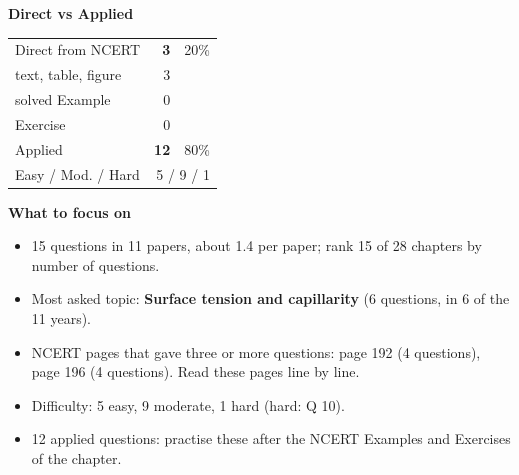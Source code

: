 \begin{minipage}[t]{0.34\linewidth}{\small\textbf{\color{crimson}Direct vs Applied}\par\smallskip
\begin{tabular}{@{}lrr@{}}\toprule
Direct from NCERT & \textbf{3} & 20\%\\
\quad text, table, figure & 3 &\\
\quad solved Example & 0 &\\
\quad Exercise & 0 &\\
Applied & \textbf{12} & 80\%\\\midrule
Easy / Mod. / Hard & \multicolumn{2}{r}{5 / 9 / 1}\\\bottomrule
\end{tabular}}\end{minipage}\hfill
\begin{minipage}[t]{0.63\linewidth}{\small\textbf{\color{crimson}What to focus on}\par\smallskip
\begin{itemize}[leftmargin=1.1em,itemsep=1pt,topsep=0pt]
\item 15 questions in 11 papers, about 1.4 per paper; rank 15 of 28 chapters by number of questions.
\item Most asked topic: \textbf{Surface tension and capillarity} (6 questions, in 6 of the 11 years).
\item NCERT pages that gave three or more questions: page 192 (4 questions), page 196 (4 questions). Read these pages line by line.
\item Difficulty: 5 easy, 9 moderate, 1 hard (hard: Q 10).
\item 12 applied questions: practise these after the NCERT Examples and Exercises of the chapter.
\end{itemize}}\end{minipage}\par
{}
